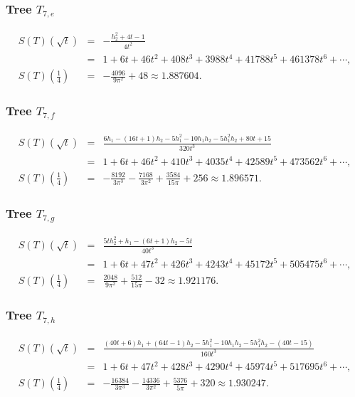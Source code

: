 \documentclass[12pt]{amsart}
\theoremstyle{plain}
\theoremstyle{remark}
\begin{document}
\subsubsection{Tree $T_{7,e}$}
\begin{eqnarray*}
S(T)(\sqrt{t}) 
& = & 
- \frac{ h_2^{2} + 4 t -1}{4 t^{2}}
\\
& = & 
1+6 t +46 t^{2}+408 t^{3}+3988 t^{4}+41788 t^{5}+461378 t^{6}+\cdots, \\
S(T)\left( \frac14\right)
& = & 
-\frac{4096}{9 \pi^{2}}+48
\approx 1.887604
 .
\end{eqnarray*}

\subsubsection{Tree $T_{7,f}$}
\begin{eqnarray*}
S(T)(\sqrt{t}) 
& = & 
\frac{ 6 h_1 - \left(16 t +1\right) h_2 - 5 h_1^{2}- 10 h_1 h_2- 5 h_1^{2} h_2 + 80 t + 15}{320 t^{3}}
\\
& = & 
1+6 t +46 t^{2}+410 t^{3}+4035 t^{4}+42589 t^{5}+473562 t^{6}+\cdots, \\
S(T)\left( \frac14\right)
& = & 
-\frac{8192}{3 \pi^{3}}
-\frac{7168}{3 \pi^{2}}
+\frac{3584}{15 \pi}
+256
\approx 1.896571
 .
\end{eqnarray*}


\subsubsection{Tree $T_{7,g}$}
\begin{eqnarray*}
S(T)(\sqrt{t}) 
& = & 
\frac{5 t h_2^{2} +  h_1-  \left(6 t +1\right)h_2  -5 t }{40 t^{3}}
\\
& = & 
1+6 t +47 t^{2}+426 t^{3}+4243 t^{4}+45172 t^{5}+505475 t^{6}+\cdots, \\
S(T)\left( \frac14\right)
& = & 
\frac{2048}{9 \pi^{2}}
+\frac{512}{15 \pi}
-32
\approx 1.921176
 .
\end{eqnarray*}

\subsubsection{Tree $T_{7,h}$}
\begin{eqnarray*}
S(T)(\sqrt{t}) 
& = & 
\frac{ \left(40 t +6\right) h_1 + \left(64 t -1\right) h_2 - 5 h_1^{2}- 10 h_1 h_2- 5 h_1^{2} h_2-(40 t - 15)}{160 t^{3}}
\\
& = & 
1+6 t +47 t^{2}+428 t^{3}+4290 t^{4}+45974 t^{5}+517695 t^{6}+\cdots, \\
S(T)\left( \frac14\right)
& = & 
-\frac{16384}{3 \pi^{3}}
-\frac{14336}{3 \pi^{2}}
+\frac{5376}{5 \pi}
+320
\approx 1.930247
 .
\end{eqnarray*}
\end{document}
